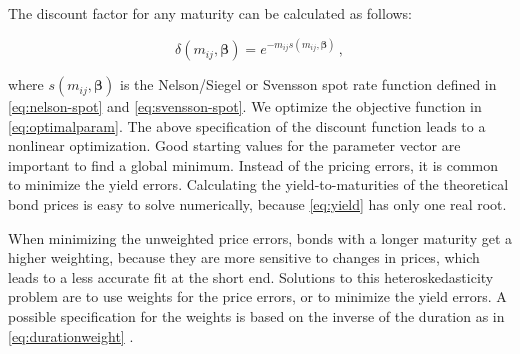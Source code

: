 The discount factor for any maturity can be calculated as follows:

\begin{displaymath}
\delta(m_{ij}, \bm{\beta})=e^{-m_{ij}s(m_{ij},\bm{\beta})}\,,
\end{displaymath}

where $s(m_{ij},\bm{\beta})$ is the Nelson/Siegel or Svensson spot rate function defined in \eqref{eq:nelson-spot} and \eqref{eq:svensson-spot}. We optimize the objective function in \eqref{eq:optimalparam}. The above specification of the discount function leads to a nonlinear optimization. Good starting values for the parameter vector are important to find a global minimum. Instead of the pricing errors, it is common to minimize the yield errors. Calculating the yield-to-maturities of the theoretical bond prices is easy to solve numerically, because \eqref{eq:yield} has only one real root. 

When minimizing the unweighted price errors, bonds with a longer maturity get a higher weighting, because they are more sensitive to changes in prices, which leads to a less accurate fit at the short end. Solutions to this heteroskedasticity problem are to use weights for the price errors, or to minimize the yield errors. A possible specification for the weights is based on the inverse of the duration as in \eqref{eq:durationweight} \citep[see][]{Bliss1997}.


